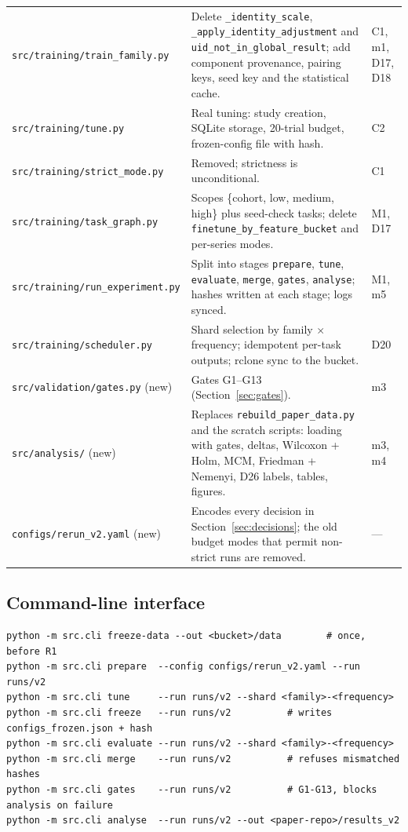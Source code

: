 \documentclass[11pt,a4paper]{article}
\newcommand{\code}[1]{\texttt{#1}}
\begin{document}
{\begin{longtable}{@{}p{4.6cm} p{7.4cm} p{3.3cm}@{}}
\code{src/training/train_family.py} & Delete \code{_identity_scale}, \code{_apply_identity_adjustment} and \code{uid_not_in_global_result}; add component provenance, pairing keys, seed key and the statistical cache. & C1, m1, D17, D18 \\
\code{src/training/tune.py} & Real tuning: study creation, SQLite storage, 20-trial budget, frozen-config file with hash. & C2 \\
\code{src/training/strict_mode.py} & Removed; strictness is unconditional. & C1 \\
\code{src/training/task_graph.py} & Scopes \{cohort, low, medium, high\} plus seed-check tasks; delete \code{finetune_by_feature_bucket} and per-series modes. & M1, D17 \\
\code{src/training/run_experiment.py} & Split into stages \code{prepare}, \code{tune}, \code{evaluate}, \code{merge}, \code{gates}, \code{analyse}; hashes written at each stage; logs synced. & M1, m5 \\
\code{src/training/scheduler.py} & Shard selection by family $\times$ frequency; idempotent per-task outputs; rclone sync to the bucket. & D20 \\
\code{src/validation/gates.py} (new) & Gates G1--G13 (Section~\ref{sec:gates}). & m3 \\
\code{src/analysis/} (new) & Replaces \code{rebuild_paper_data.py} and the scratch scripts: loading with gates, deltas, Wilcoxon + Holm, MCM, Friedman + Nemenyi, D26 labels, tables, figures. & m3, m4 \\
\code{configs/rerun_v2.yaml} (new) & Encodes every decision in Section~\ref{sec:decisions}; the old budget modes that permit non-strict runs are removed. & --- \\
\end{longtable}
}

\subsection{Command-line interface}

\begin{verbatim}
python -m src.cli freeze-data --out <bucket>/data        # once, before R1
python -m src.cli prepare  --config configs/rerun_v2.yaml --run runs/v2
python -m src.cli tune     --run runs/v2 --shard <family>-<frequency>
python -m src.cli freeze   --run runs/v2          # writes configs_frozen.json + hash
python -m src.cli evaluate --run runs/v2 --shard <family>-<frequency>
python -m src.cli merge    --run runs/v2          # refuses mismatched hashes
python -m src.cli gates    --run runs/v2          # G1-G13, blocks analysis on failure
python -m src.cli analyse  --run runs/v2 --out <paper-repo>/results_v2
\end{verbatim}
\end{document}
